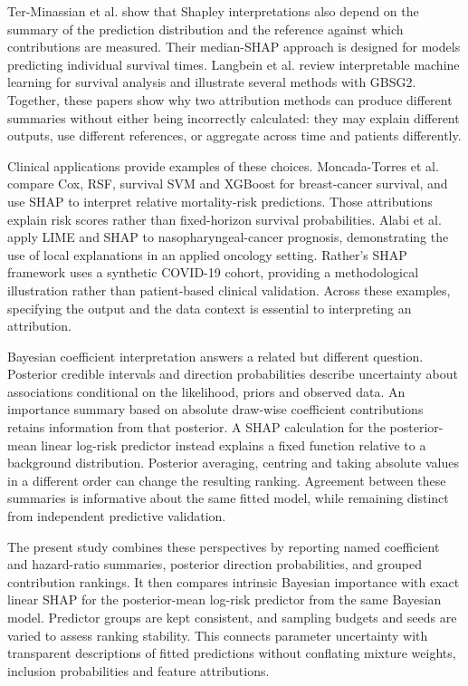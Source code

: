 Ter-Minassian et al. \cite{ref7} show that Shapley interpretations also depend on the summary of the prediction distribution and the reference against which contributions are measured. Their median-SHAP approach is designed for models predicting individual survival times. Langbein et al. \cite{ref61} review interpretable machine learning for survival analysis and illustrate several methods with GBSG2. Together, these papers show why two attribution methods can produce different summaries without either being incorrectly calculated: they may explain different outputs, use different references, or aggregate across time and patients differently.

Clinical applications provide examples of these choices. Moncada-Torres et al. \cite{ref62} compare Cox, RSF, survival SVM and XGBoost for breast-cancer survival, and use SHAP to interpret relative mortality-risk predictions. Those attributions explain risk scores rather than fixed-horizon survival probabilities. Alabi et al. \cite{ref28} apply LIME and SHAP to nasopharyngeal-cancer prognosis, demonstrating the use of local explanations in an applied oncology setting. Rather's SHAP framework \cite{ref29} uses a synthetic COVID-19 cohort, providing a methodological illustration rather than patient-based clinical validation. Across these examples, specifying the output and the data context is essential to interpreting an attribution.

Bayesian coefficient interpretation answers a related but different question. Posterior credible intervals and direction probabilities describe uncertainty about associations conditional on the likelihood, priors and observed data. An importance summary based on absolute draw-wise coefficient contributions retains information from that posterior. A SHAP calculation for the posterior-mean linear log-risk predictor instead explains a fixed function relative to a background distribution. Posterior averaging, centring and taking absolute values in a different order can change the resulting ranking. Agreement between these summaries is informative about the same fitted model, while remaining distinct from independent predictive validation.

The present study combines these perspectives by reporting named coefficient and hazard-ratio summaries, posterior direction probabilities, and grouped contribution rankings. It then compares intrinsic Bayesian importance with exact linear SHAP for the posterior-mean log-risk predictor from the same Bayesian model. Predictor groups are kept consistent, and sampling budgets and seeds are varied to assess ranking stability. This connects parameter uncertainty with transparent descriptions of fitted predictions without conflating mixture weights, inclusion probabilities and feature attributions.

